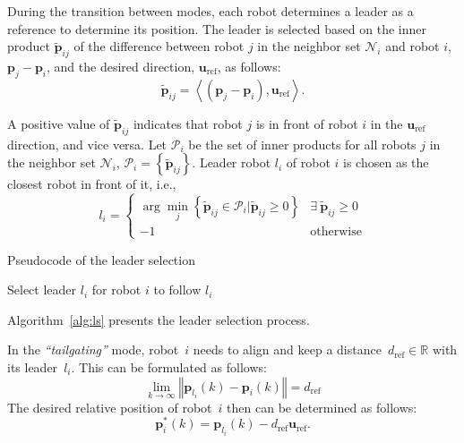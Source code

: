 During the transition between modes, each robot determines a leader as a reference to determine its position. The leader is selected based on the inner product $\tilde{\mathbf{p}}_{ij}$ of the difference between robot $j$ in the neighbor set $\mathcal{N}_i$ and robot $i$, $\mathbf{p}_j-\mathbf{p}_i$, and the desired direction, $\mathbf{u}_\text{ref}$, as follows:
\begin{equation}
    \tilde{\mathbf{p}}_{ij} = \left\langle (\mathbf{p}_j-\mathbf{p}_i),\mathbf{u}_\text{ref}\right\rangle.
    \label{eqn:tildep}
\end{equation}

A positive value of $\tilde{\mathbf{p}}_{ij}$ indicates that robot $j$ is in front of robot $i$ in the $\mathbf{u}_\text{ref}$ direction, and vice versa. Let $\mathcal{P}_i$ be the set of inner products for all robots $j$ in the neighbor set $\mathcal{N}_i$, $\mathcal{P}_i=\left\{\tilde{\mathbf{p}}_{ij}\right\}$. Leader robot ${l_i}$ of robot $i$ is chosen as the closest robot in front of it, i.e.,
\begin{equation}
     l_i=\begin{cases}
    \arg\min_{j}\left\{\tilde{\mathbf{p}}_{ij}\in\mathcal{P}_i\vert\tilde{\mathbf{p}}_{ij}\geq0\right\} & \exists~\tilde{\mathbf{p}}_{ij}\geq0\\ 
    -1 & \text{otherwise}
     \end{cases}
    \label{eqn:li}
\end{equation}

\begin{algorithm}
\caption{Pseudocode of the leader selection}
\label{alg:ls}
Select leader $l_i$ for robot $i$ to follow
\Return $l_i$\;
\end{algorithm}

Algorithm~\ref{alg:ls} presents the leader selection process. 

In the \textit{``tailgating''} mode, robot~$i$ needs to align and keep a distance~$d_\text{ref}\in\mathbb{R}$ with its leader~$l_i$. This can be formulated as follows:
\begin{equation}
    \lim_{k\to\infty}{\left\Vert \mathbf{p}_{l_i}(k)-\mathbf{p}_i(k)\right\Vert}=d_\text{ref}
    \label{eqn:tailcon}
\end{equation}
The desired relative position of robot~$i$ then can be determined as follows:
\begin{equation}
    \mathbf{p}_i^*(k)= \mathbf{p}_{l_i}(k)-d_\text{ref}\mathbf{u}_\text{ref}.
    \label{eqn:tailgating}
\end{equation}

